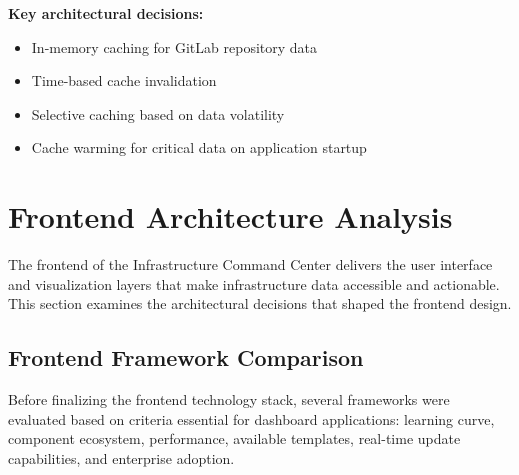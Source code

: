 \textbf{Key architectural decisions:}
\begin{itemize}
    \item In-memory caching for GitLab repository data
    \item Time-based cache invalidation
    \item Selective caching based on data volatility
    \item Cache warming for critical data on application startup
\end{itemize}
\section{Frontend Architecture Analysis}

The frontend of the Infrastructure Command Center delivers the user interface and visualization layers that make infrastructure data accessible and actionable. This section examines the architectural decisions that shaped the frontend design.

\subsection{Frontend Framework Comparison}

Before finalizing the frontend technology stack, several frameworks were evaluated based on criteria essential for dashboard applications: learning curve, component ecosystem, performance, available templates, real-time update capabilities, and enterprise adoption.


\begin{table}[h!]
\centering
\renewcommand{\arraystretch}{1.8} %
\setlength{\arrayrulewidth}{0.3mm} %
\setlength{\tabcolsep}{4pt} %
\small
\noindent{}
\caption{Frontend Framework Comparison}
\end{table}


